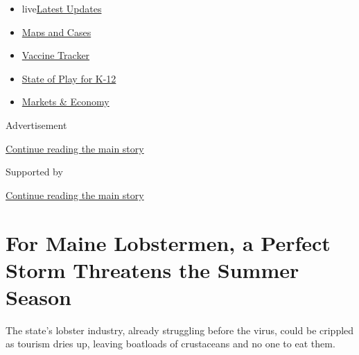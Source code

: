 \begin{itemize}
\tightlist
\item
  live\href{https://www.nytimes.com/2020/08/17/world/coronavirus-covid.html?name=styln-coronavirus-national\&region=TOP_BANNER\&variant=undefined\&block=storyline_menu_recirc\&action=click\&pgtype=Article\&impression_id=a487c291-e108-11ea-b959-2b70faf7b631}{Latest
  Updates}
\item
  \href{https://www.nytimes.com/interactive/2020/us/coronavirus-us-cases.html?name=styln-coronavirus-national\&region=TOP_BANNER\&variant=undefined\&block=storyline_menu_recirc\&action=click\&pgtype=Article\&impression_id=a487c292-e108-11ea-b959-2b70faf7b631}{Maps
  and Cases}
\item
  \href{https://www.nytimes.com/interactive/2020/science/coronavirus-vaccine-tracker.html?name=styln-coronavirus-national\&region=TOP_BANNER\&variant=undefined\&block=storyline_menu_recirc\&action=click\&pgtype=Article\&impression_id=a487c293-e108-11ea-b959-2b70faf7b631}{Vaccine
  Tracker}
\item
  \href{https://www.nytimes.com/2020/08/17/us/k-12-schools-reopening.html?name=styln-coronavirus-national\&region=TOP_BANNER\&variant=undefined\&block=storyline_menu_recirc\&action=click\&pgtype=Article\&impression_id=a487c294-e108-11ea-b959-2b70faf7b631}{State
  of Play for K-12}
\item
  \href{https://www.nytimes.com/live/2020/08/17/business/stock-market-today-coronavirus?name=styln-coronavirus-national\&region=TOP_BANNER\&variant=undefined\&block=storyline_menu_recirc\&action=click\&pgtype=Article\&impression_id=a487c295-e108-11ea-b959-2b70faf7b631}{Markets
  \& Economy}
\end{itemize}

Advertisement

\protect\hyperlink{after-top}{Continue reading the main story}

Supported by

\protect\hyperlink{after-sponsor}{Continue reading the main story}

\hypertarget{for-maine-lobstermen-a-perfect-storm-threatens-the-summer-season}{%
\section{For Maine Lobstermen, a Perfect Storm Threatens the Summer
Season}\label{for-maine-lobstermen-a-perfect-storm-threatens-the-summer-season}}

The state's lobster industry, already struggling before the virus, could
be crippled as tourism dries up, leaving boatloads of crustaceans and no
one to eat them.

